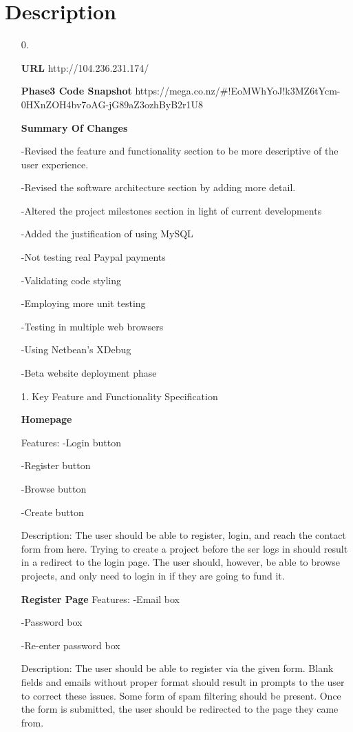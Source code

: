 \documentclass[12pt]{article}
\begin{document}
\section*{Description}
\begin{enumerate}

\item[0.]

\textbf{URL}
http://104.236.231.174/

\textbf{Phase3 Code Snapshot}
https://mega.co.nz/#!EoMWhYoJ!k3MZ6tYcm-0HXnZOH4bv7oAG-jG89aZ3ozhByB2r1U8

\textbf{Summary Of Changes}

-Revised the feature and functionality section to be more descriptive of the user experience.

-Revised the software architecture section by adding more detail.

-Altered the project milestones section in light of current developments

-Added the justification of using MySQL

-Not testing real Paypal payments

-Validating code styling

-Employing more unit testing

-Testing in multiple web browsers

-Using Netbean’s XDebug

-Beta website deployment phase


\item[1.] Key Feature and Functionality Specification

\textbf{Homepage}

Features:
-Login button

-Register button

-Browse button

-Create button

Description: The user should be able to register, login, and reach the contact form from here.
Trying to create a project before the ser logs in should result in a redirect to the login page.
The user should, however, be able to browse projects, and only need to login in if they are going to fund it.

\textbf{Register Page}
Features:
-Email box

-Password box

-Re-enter password box

Description:
The user should be able to register via the given form.
Blank fields and emails without proper format should result in prompts to the user to correct these issues.
Some form of spam filtering should be present.
Once the form is submitted, the user should be redirected to the page they came from.


\end{enumerate}
\end{document}
